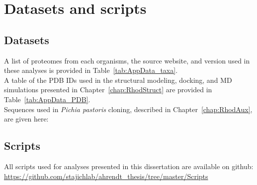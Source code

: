 \chapter{Datasets and scripts}
\label{app:Data}
\section*{Datasets}
A list of proteomes from each organisms, the source website, and version used in these analyses is provided in Table~\ref{tab:AppData_taxa}.\\
A table of the PDB IDs used in the structural modeling, docking, and MD simulations presented in Chapter~\ref{chap:RhodStruct} are provided in Table~\ref{tab:AppData_PDB}.\\
Sequences used in \textit{Pichia pastoris} cloning, described in Chapter~\ref{chap:RhodAux}, are given here:\\
\section*{Scripts}
All scripts used for analyses presented in this dissertation are available on github: \url{https://github.com/stajichlab/ahrendt_thesis/tree/master/Scripts}
